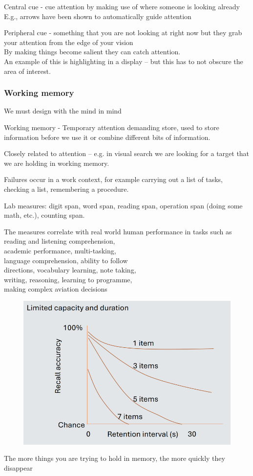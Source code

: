 \documentclass[]{project_plan}
\begin{document}
Central cue - cue attention by making use of where someone is looking already\\
E.g., arrows have been shown to automatically guide attention

Peripheral cue - something that you are not looking at right now but they grab
your attention from the edge of your vision\\
By making things become salient they can catch attention.\\
An example of this is highlighting in a display – but this has to not obscure the
area of interest.

\subsubsection{Working memory}
We must design with the mind in mind

Working memory - Temporary attention demanding store, used to store information
before we use it or combine different bits of information.

Closely related to attention – e.g. in visual search we are looking for a target
that we are holding in working memory.

Failures occur in a work context, for example carrying out a list of tasks,
checking a list, remembering a procedure.

Lab measures:
digit span, word span, reading span, operation span (doing some math, etc.),
counting span.

The measures correlate with real world human performance in tasks such as\\
reading and listening comprehension,\\
academic performance, multi-tasking,\\
language comprehension, ability to follow\\
directions, vocabulary learning, note taking,\\
writing, reasoning, learning to programme,\\
making complex aviation decisions

\newpage

\begin{figure}[h!]
  \centering
  \includegraphics[width=\linewidth]{working_memory_decay_graph.png}
\end{figure}
The more things you are trying to hold in memory, the more quickly they disappear
\end{document}
